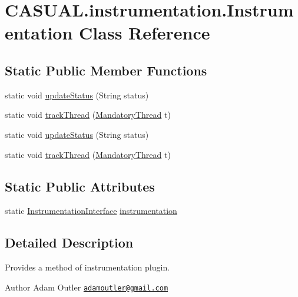 \hypertarget{class_c_a_s_u_a_l_1_1instrumentation_1_1_instrumentation}{\section{C\-A\-S\-U\-A\-L.\-instrumentation.\-Instrumentation Class Reference}
\label{class_c_a_s_u_a_l_1_1instrumentation_1_1_instrumentation}
}
\subsection*{Static Public Member Functions}
\begin{DoxyCompactItemize}
\item 
static void \hyperlink{class_c_a_s_u_a_l_1_1instrumentation_1_1_instrumentation_a0ea511ac0bacfa0204a6eed29e72332c}{update\-Status} (String status)
\item 
static void \hyperlink{class_c_a_s_u_a_l_1_1instrumentation_1_1_instrumentation_ad5e6186b100cb74ca1722ee2701fd747}{track\-Thread} (\hyperlink{class_c_a_s_u_a_l_1_1misc_1_1_mandatory_thread}{Mandatory\-Thread} t)
\item 
static void \hyperlink{class_c_a_s_u_a_l_1_1instrumentation_1_1_instrumentation_a0ea511ac0bacfa0204a6eed29e72332c}{update\-Status} (String status)
\item 
static void \hyperlink{class_c_a_s_u_a_l_1_1instrumentation_1_1_instrumentation_ad5e6186b100cb74ca1722ee2701fd747}{track\-Thread} (\hyperlink{class_c_a_s_u_a_l_1_1misc_1_1_mandatory_thread}{Mandatory\-Thread} t)
\end{DoxyCompactItemize}
\subsection*{Static Public Attributes}
\begin{DoxyCompactItemize}
\item 
static \hyperlink{interface_c_a_s_u_a_l_1_1instrumentation_1_1_instrumentation_interface}{Instrumentation\-Interface} \hyperlink{class_c_a_s_u_a_l_1_1instrumentation_1_1_instrumentation_a8821cf89e9b9aa9936ee1fb91197e741}{instrumentation}
\end{DoxyCompactItemize}


\subsection{Detailed Description}
Provides a method of instrumentation plugin. \begin{DoxyAuthor}{Author}
Adam Outler \href{mailto:adamoutler@gmail.com}{\tt adamoutler@gmail.\-com} 
\end{DoxyAuthor}



